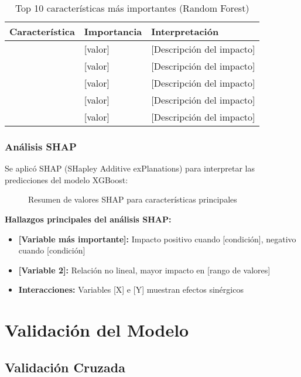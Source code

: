 \begin{table}[htbp]
\centering
\caption{Top 10 características más importantes (Random Forest)}
\begin{tabular}{@{}p{4cm}p{3cm}p{6cm}@{}}
\toprule
\textbf{Característica} & \textbf{Importancia} & \textbf{Interpretación} \\
\midrule
[Variable 1] & [valor] & [Descripción del impacto] \\
[Variable 2] & [valor] & [Descripción del impacto] \\
[Variable 3] & [valor] & [Descripción del impacto] \\
[Variable 4] & [valor] & [Descripción del impacto] \\
[Variable 5] & [valor] & [Descripción del impacto] \\
\bottomrule
\end{tabular}
\label{tab:feature_importance}
\end{table}

\subsubsection{Análisis SHAP}

Se aplicó SHAP (SHapley Additive exPlanations) para interpretar las predicciones del modelo XGBoost:

\begin{figure}[htbp]
\centering
\caption{Resumen de valores SHAP para características principales}
\label{fig:shap_summary}
\end{figure}

\textbf{Hallazgos principales del análisis SHAP:}

\begin{itemize}
    \item \textbf{[Variable más importante]:} Impacto positivo cuando [condición], negativo cuando [condición]
    \item \textbf{[Variable 2]:} Relación no lineal, mayor impacto en [rango de valores]
    \item \textbf{Interacciones:} Variables [X] e [Y] muestran efectos sinérgicos
\end{itemize}

\section{Validación del Modelo}

\subsection{Validación Cruzada}

